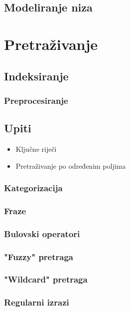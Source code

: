 \documentclass[11pt]{scrreprt}
\begin{document}
\section{Modeliranje niza}

\chapter{Pretraživanje}

\section{Indeksiranje}

\subsection{Preprocesiranje}

\section{Upiti}

\begin{itemize}
  \item{Ključne riječi}
  \item{Pretraživanje po određenim poljima}
\end{itemize}

\subsection{Kategorizacija}

\subsection{Fraze}

\subsection{Bulovski operatori}

\subsection{"Fuzzy" pretraga}

\subsection{"Wildcard" pretraga}

\subsection{Regularni izrazi}
\end{document}
